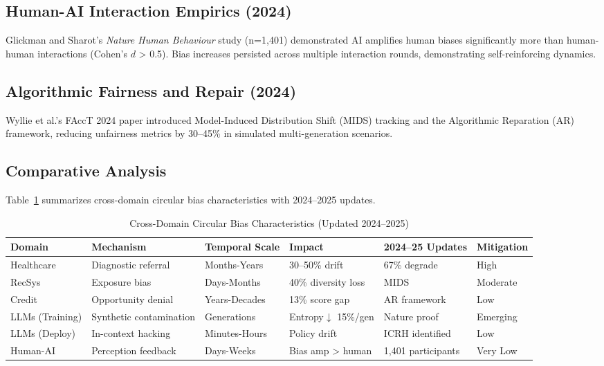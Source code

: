 \documentclass[11pt]{article}
\begin{document}
\subsection{Human-AI Interaction Empirics (2024)}

Glickman and Sharot's\cite{glickman2024} \textit{Nature Human Behaviour} study (n=1,401) demonstrated AI amplifies human biases significantly more than human-human interactions (Cohen's $d$ > 0.5). Bias increases persisted across multiple interaction rounds, demonstrating self-reinforcing dynamics.

\subsection{Algorithmic Fairness and Repair (2024)}

Wyllie et al.'s\cite{wyllie2024} FAccT 2024 paper introduced Model-Induced Distribution Shift (MIDS) tracking and the Algorithmic Reparation (AR) framework, reducing unfairness metrics by 30–45\% in simulated multi-generation scenarios.

\subsection{Comparative Analysis}

Table~\ref{tab:domains} summarizes cross-domain circular bias characteristics with 2024–2025 updates.

\begin{table}[ht]
\centering
\caption{Cross-Domain Circular Bias Characteristics (Updated 2024–2025)}
\label{tab:domains}
\small
\begin{tabular}{@{}lllllp{3cm}@{}}
\toprule
\textbf{Domain} & \textbf{Mechanism} & \textbf{Temporal Scale} & \textbf{Impact} & \textbf{2024–25 Updates} & \textbf{Mitigation} \\
\midrule
Healthcare & Diagnostic referral & Months-Years & 30–50\% drift & 67\% degrade\cite{nestor2024} & High \\
RecSys & Exposure bias & Days-Months & 40\% diversity loss & MIDS\cite{wyllie2024} & Moderate \\
Credit & Opportunity denial & Years-Decades & 13\% score gap & AR framework\cite{wyllie2024} & Low \\
LLMs (Training) & Synthetic contamination & Generations & Entropy$\downarrow$ 15\%/gen & Nature proof\cite{shumailov2024} & Emerging \\
LLMs (Deploy) & In-context hacking & Minutes-Hours & Policy drift\cite{pan2024} & ICRH identified & Low \\
Human-AI & Perception feedback & Days-Weeks & Bias amp > human\cite{glickman2024} & 1,401 participants & Very Low \\
\bottomrule
\end{tabular}
\end{table}
\end{document}
